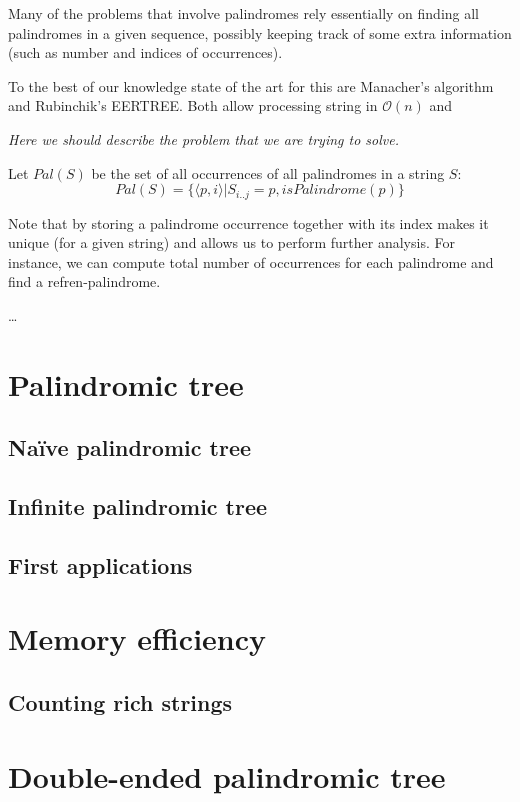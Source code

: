 Many of the problems that involve palindromes rely essentially on finding
all palindromes in a given sequence, possibly keeping track of some extra information
(such as number and indices of occurrences).

To the best of our knowledge state of the art for this are Manacher's algorithm
and Rubinchik's EERTREE. Both allow processing string in $\mathcal{O}(n)$ and

\emph{Here we should describe the problem that we are trying to solve.}

Let $Pal(S)$ be the set of all occurrences of all
palindromes in a string $S$:
$$
Pal(S) = \{ \langle p, i \rangle | S_{i..j} = p, isPalindrome(p) \}
$$

Note that by storing a palindrome occurrence together with its index
makes it unique (for a given string) and allows us to perform further
analysis. For instance, we can compute total number of occurrences
for each palindrome and find a refren-palindrome.

\ldots

\section{Palindromic tree}

\subsection{Naïve palindromic tree}

\subsection{Infinite palindromic tree}

\subsection{First applications}

\section{Memory efficiency}

\subsection{Counting rich strings}

\section{Double-ended palindromic tree}

